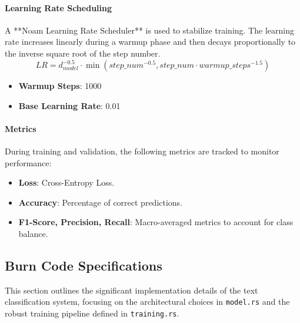 \documentclass[10pt,a4paper,twocolumn]{article}
\begin{document}
\paragraph{Learning Rate Scheduling}
A **Noam Learning Rate Scheduler** is used to stabilize training. The learning rate increases linearly during a warmup phase and then decays proportionally to the inverse square root of the step number.
\begin{equation}
    LR = d_{model}^{-0.5} \cdot \min(step\_num^{-0.5}, step\_num \cdot warmup\_steps^{-1.5})
\end{equation}
\begin{itemize}
    \item \textbf{Warmup Steps}: 1000
    \item \textbf{Base Learning Rate}: 0.01
\end{itemize}

\paragraph{Metrics}
During training and validation, the following metrics are tracked to monitor performance:
\begin{itemize}
    \item \textbf{Loss}: Cross-Entropy Loss.
    \item \textbf{Accuracy}: Percentage of correct predictions.
    \item \textbf{F1-Score, Precision, Recall}: Macro-averaged metrics to account for class balance.
\end{itemize}

\subsection{Burn Code Specifications}

This section outlines the significant implementation details of the text classification system, focusing on the architectural choices in \texttt{model.rs} and the robust training pipeline defined in \texttt{training.rs}.
\end{document}
